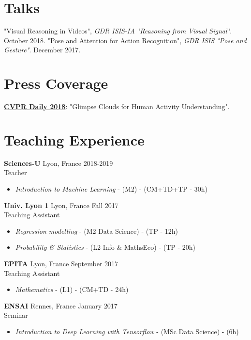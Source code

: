 \documentclass[10pt]{res} %
\begin{document}
\begin{resume}

\section{\large Talks}
"Visual Reasoning in Videos",  \textit{GDR ISIS-IA "Reasoning from Visual Signal"}. October 2018.
"Pose and Attention for Action Recognition", \textit{GDR ISIS "Pose and Gesture"}. December 2017.



\section{\large Press Coverage}
\href{https://www.rsipvision.com/CVPR2018-Tuesday/14/}{\textbf{CVPR Daily 2018}}: "Glimpse Clouds for Human Activity Understanding".

\section{\large Teaching Experience}
\textbf{Sciences-U} \hfill Lyon, France \hfill 2018-2019 \\
Teacher
\begin{itemize}
	\item \textit{Introduction to Machine Learning} - (M2) - (CM+TD+TP - 30h)
\end{itemize}

\textbf{Univ. Lyon 1} \hfill Lyon, France \hfill Fall 2017 \\
Teaching Assistant
\begin{itemize}
	\item \textit{Regression modelling}  - (M2 Data Science) - (TP - 12h)
	\item \textit{Probability \& Statistics}  - (L2 Info \& MathsEco) - (TP - 20h)
\end{itemize}

\textbf{EPITA} \hfill Lyon, France \hfill September 2017 \\
Teaching Assistant
\begin{itemize}
	\item \textit{Mathematics} - (L1) - (CM+TD - 24h)
\end{itemize}

\textbf{ENSAI} \hfill Rennes, France \hfill January 2017 \\
Seminar
\begin{itemize}
\item \textit{Introduction to Deep Learning with Tensorflow} - (MSc Data Science) - (6h)
\end{itemize}


\end{resume}
\end{document}
